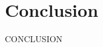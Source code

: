 \documentclass[../access.tex]{subfiles}
\begin{document}
\section{Conclusion}
\label{sec:conclusion}
CONCLUSION \cite{Lai2018}
\end{document}
